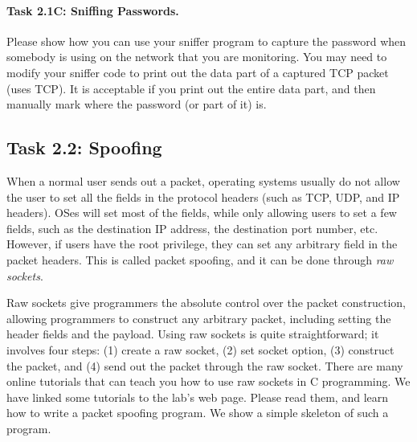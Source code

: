 \paragraph{Task 2.1C: Sniffing Passwords.}
Please show how you can use your sniffer program to capture the 
password when somebody is using \telnet on the 
network that you are monitoring. You may need to modify
your sniffer code to print out the data part of a captured TCP 
packet (\telnet uses TCP). It is acceptable if you print out the entire data part, and then
manually mark where the password (or part of it) is.




\subsection{Task 2.2: Spoofing}

When a normal user sends out a packet, operating systems
usually do not allow the user to set all the fields in the protocol 
headers (such as TCP, UDP, and IP headers). OSes will
set most of the fields, while only allowing users to 
set a few fields, such as the destination IP address, 
the destination port number, etc.  However, if 
users have the root privilege, they can set any 
arbitrary field in the packet headers. This is 
called packet spoofing, and it can be done through
{\em raw sockets}. 


Raw sockets give programmers the absolute control over the packet 
construction, allowing programmers to construct any arbitrary packet, including 
setting the header fields and the payload. Using raw sockets is 
quite straightforward; it involves four steps: (1) create a raw socket,
(2) set socket option, (3) construct the packet, and (4) send 
out the packet through the raw socket. There are 
many online tutorials that can teach you how to 
use raw sockets in C programming. We have linked some tutorials
to the lab's web page. Please read them, and learn how to 
write a packet spoofing program. We show a simple skeleton of 
such a program. 


